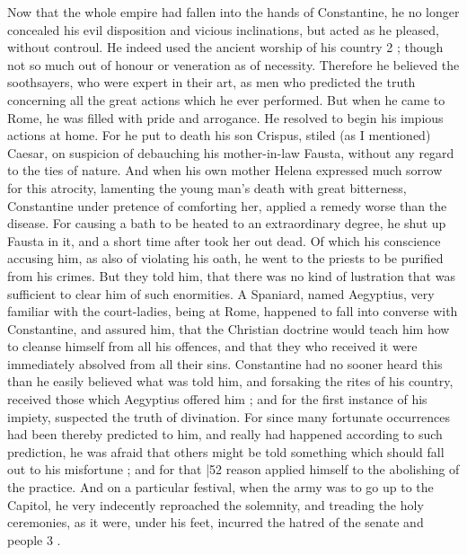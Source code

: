 Now that the whole empire had fallen into the hands of Constantine, he no longer concealed his evil disposition and vicious inclinations, but acted as he pleased, without controul. He indeed used the ancient worship of his
country 2 ; though not so much out of honour or veneration as of necessity. Therefore he believed the soothsayers, who were expert in their art, as men who predicted the truth concerning all the great actions which he ever performed. But when he came to Rome, he was filled with pride and arrogance. He resolved to begin his impious actions at home. For he put to death his son Crispus, stiled (as I mentioned) Caesar, on suspicion of debauching his mother-in-law Fausta, without any regard to the ties of nature. And when his own mother Helena expressed much sorrow for this atrocity, lamenting the young man's death with great bitterness, Constantine under pretence of comforting her, applied a remedy worse than the disease. For causing a bath to be heated to an extraordinary degree, he shut up Fausta in it, and a short time after took her out dead. Of which his conscience accusing him, as also of violating his oath, he went to the priests to be purified from his crimes. But they told him, that there was no kind of lustration that was sufficient to clear him of such enormities. A Spaniard, named Aegyptius, very familiar with the court-ladies, being at Rome, happened to fall into converse with Constantine, and assured him, that the Christian doctrine would teach him how to cleanse himself from all his offences, and that they who received it were immediately absolved from all their sins. Constantine had no sooner heard this than he easily believed what was told him, and forsaking the rites of his country, received those which Aegyptius offered him ; and for the first instance of his impiety, suspected the truth of divination. For since many fortunate occurrences had been thereby predicted to him, and really had happened according to such prediction, he was afraid that others might be told something which should fall out to his misfortune ; and for that
|52 reason applied himself to the abolishing of the practice. And on a particular festival, when the army was to go up to the Capitol, he very indecently reproached the solemnity, and treading the holy ceremonies, as it were, under his feet, incurred the hatred of the senate and
people 3 .

